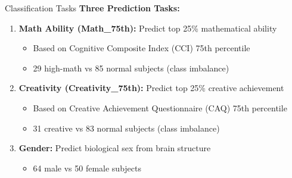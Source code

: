 \documentclass{beamer}
\begin{document}
\begin{frame}{Classification Tasks}
\textbf{Three Prediction Tasks:}

\begin{enumerate}
  \item \textbf{Math Ability (Math\_75th):} Predict top 25\% mathematical ability
  \begin{itemize}
    \item Based on Cognitive Composite Index (CCI) 75th percentile
    \item 29 high-math vs 85 normal subjects (class imbalance)
  \end{itemize}
  
  \vspace{0.3cm}
  
  \item \textbf{Creativity (Creativity\_75th):} Predict top 25\% creative achievement
  \begin{itemize}
    \item Based on Creative Achievement Questionnaire (CAQ) 75th percentile
    \item 31 creative vs 83 normal subjects (class imbalance)
  \end{itemize}
  
  \vspace{0.3cm}
  
  \item \textbf{Gender:} Predict biological sex from brain structure
  \begin{itemize}
    \item 64 male vs 50 female subjects
  \end{itemize}
\end{enumerate}
\end{frame}
\end{document}
